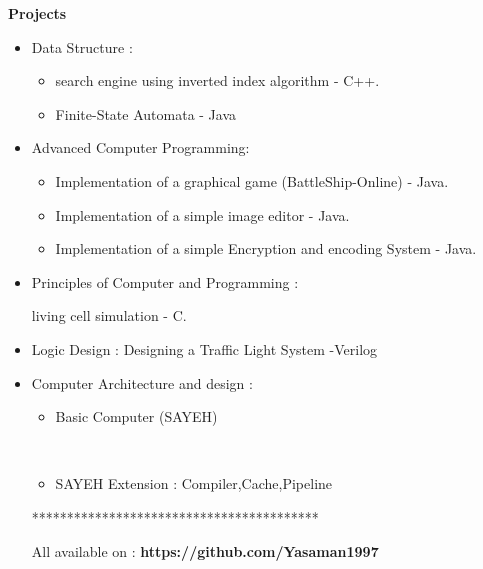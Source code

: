 \documentclass[a4paper,12pt,final]{memoir}
\newcommand{\Sep}{\vspace{1.5em}}
\newcommand{\SmallSep}{\vspace{0.5em}}
\newcommand{\CVSection}[1]
	{\Large\textbf{#1}\par
	\SmallSep\normalsize\normalfont}
\newcommand{\CVItem}[1]
	{\textbf{\color{RoyalBlue} #1}}
\begin{document}
\Sep 

\CVSection{Projects}
\begin{itemize}
	\item Data Structure :
		\begin{itemize}[$\circ$]
		\item	search engine using inverted index algorithm - C++.
	     \item   Finite-State Automata - Java
		\end{itemize}
		
	\item Advanced Computer Programming:
		\begin{itemize}[$\circ$]
		\item  Implementation of a graphical game (BattleShip-Online) - Java.
     	\item Implementation of a simple image editor - Java.
	    \item Implementation of a simple Encryption and encoding System  - Java.
		\end{itemize}
		
	\item Principles of Computer and Programming : 
	
	living cell simulation - C.
   	\item Logic Design : 
   	Designing a Traffic Light System -Verilog
   	\item Computer Architecture and design :
   		\begin{itemize}[$\circ$]
		\item Basic Computer (SAYEH)
		
\newpage
\normalsize\normalfont
\framebreak
\framebreak
\\

		\item SAYEH Extension : Compiler,Cache,Pipeline
		\end{itemize}
		

*****************************************


All	available on :
  \CVItem { https://github.com/Yasaman1997}
 	
\end{itemize}

\Sep
\end{document}
